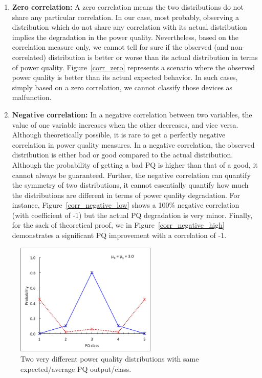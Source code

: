 \begin{enumerate}
\item \textbf{Zero correlation:} A zero correlation means the two distributions do not share any particular correlation. In our case, most probably, observing a distribution which do not share any correlation with its actual distribution implies the degradation in the power quality. Nevertheless, based on the correlation measure only, we cannot tell for sure if the observed (and non-correlated) distribution is better or worse than its actual distribution in terms of power quality. Figure~\ref{corr_zero} represents a scenario where the observed power quality is better than its actual expected behavior. In such cases, simply based on a zero correlation, we cannot classify those devices as malfunction.

\item \textbf{Negative correlation:} In a negative correlation between two variables, the value of one variable increases when the other decreases, and vice versa. Although theoretically possible, it is rare to get a perfectly negative correlation in power quality measures. In a negative correlation, the observed distribution is either bad or good compared to the actual distribution. Although the probability of getting a bad PQ is higher than that of a good, it cannot always be guaranteed. Further, the negative correlation can quantify the symmetry of two distributions, it cannot essentially quantify how much the distributions are different in terms of power quality degradation. For instance, Figure~\ref{corr_negative_low} shows a 100\% negative correlation (with coefficient of -1) but the actual PQ degradation is very minor. Finally, for the sack of theoretical proof, we in Figure~\ref{corr_negative_high} demonstrates a significant PQ improvement with a correlation of -1.

\end{enumerate}

\begin{figure}[!t]
\centering
\includegraphics[width=0.6\textwidth]{average_pq_exception}
\caption{Two very different power quality distributions with same expected/average PQ output/class.}
\label{fig:average_pq_exception}
\end{figure}

